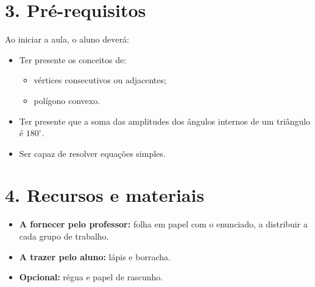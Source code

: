 \section*{3. Pré-requisitos}
Ao iniciar a aula, o aluno deverá:
\begin{itemize}[leftmargin=*,itemsep=2pt]
\item Ter presente os conceitos de:
\begin{itemize}[itemsep=1pt]
\item vértices consecutivos ou adjacentes;
\item polígono convexo.
\end{itemize}
\item Ter presente que a soma das amplitudes dos ângulos internos de um triângulo é $180^\circ$.
\item Ser capaz de resolver equações simples.
\end{itemize}

\section*{4. Recursos e materiais}
\begin{itemize}[leftmargin=*,itemsep=2pt]
\item \textbf{A fornecer pelo professor:} folha em papel com o enunciado, a distribuir a cada grupo de trabalho.
\item \textbf{A trazer pelo aluno:}  lápis e borracha.
\item \textbf{Opcional:} régua e papel de rascunho.
\end{itemize}

